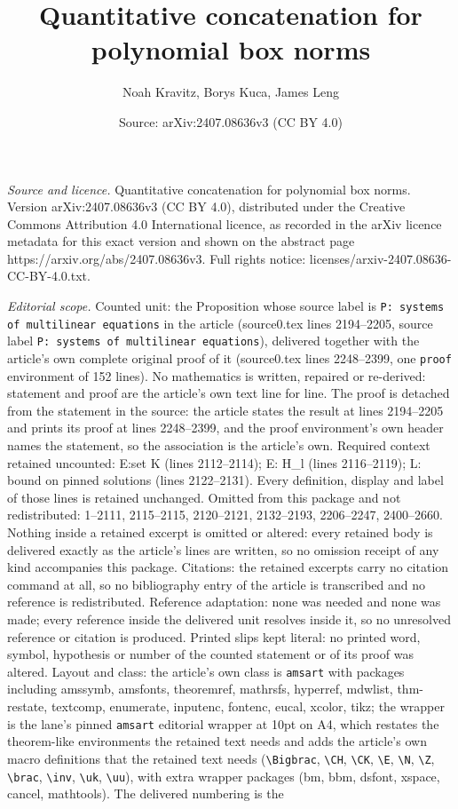 \documentclass[10pt,a4paper]{amsart}
\title[Quantitative concatenation for polynomial box norms]{Quantitative concatenation for polynomial box norms}
\author{Noah Kravitz, Borys Kuca, James Leng}
\date{Source: arXiv:2407.08636v3 (CC BY 4.0)}
\begin{document}
\maketitle

\noindent\emph{Source and licence.} Quantitative concatenation for polynomial box norms. Version arXiv:2407.08636v3 (CC BY 4.0), distributed under the Creative Commons Attribution 4.0 International licence, as recorded in the arXiv licence metadata for this exact version and shown on the abstract page https://arxiv.org/abs/2407.08636v3. Full rights notice: licenses/arxiv-2407.08636-CC-BY-4.0.txt.\par\smallskip

\noindent\textit{Editorial scope.} Counted unit: the Proposition whose source label is \texttt{P: systems of multilinear equations} in the article (source0.tex lines 2194--2205, source label \texttt{P: systems of multilinear equations}), delivered together with the article's own complete original proof of it (source0.tex lines 2248--2399, one \texttt{proof} environment of 152 lines). No mathematics is written, repaired or re-derived: statement and proof are the article's own text line for line. The proof is detached from the statement in the source: the article states the result at lines 2194--2205 and prints its proof at lines 2248--2399, and the proof environment's own header names the statement, so the association is the article's own. Required context retained uncounted: E:set K (lines 2112--2114); E: H\_l (lines 2116--2119); L: bound on pinned solutions (lines 2122--2131). Every definition, display and label of those lines is retained unchanged. Omitted from this package and not redistributed: 1--2111, 2115--2115, 2120--2121, 2132--2193, 2206--2247, 2400--2660. Nothing inside a retained excerpt is omitted or altered: every retained body is delivered exactly as the article's lines are written, so no omission receipt of any kind accompanies this package. Citations: the retained excerpts carry no citation command at all, so no bibliography entry of the article is transcribed and no reference is redistributed. Reference adaptation: none was needed and none was made; every reference inside the delivered unit resolves inside it, so no unresolved reference or citation is produced. Printed slips kept literal: no printed word, symbol, hypothesis or number of the counted statement or of its proof was altered. Layout and class: the article's own class is \texttt{amsart} with packages including amssymb, amsfonts, theoremref, mathrsfs, hyperref, mdwlist, thm-restate, textcomp, enumerate, inputenc, fontenc, eucal, xcolor, tikz; the wrapper is the lane's pinned \texttt{amsart} editorial wrapper at 10pt on A4, which restates the theorem-like environments the retained text needs and adds the article's own macro definitions that the retained text needs (\texttt{\textbackslash Bigbrac}, \texttt{\textbackslash CH}, \texttt{\textbackslash CK}, \texttt{\textbackslash E}, \texttt{\textbackslash N}, \texttt{\textbackslash Z}, \texttt{\textbackslash brac}, \texttt{\textbackslash inv}, \texttt{\textbackslash uk}, \texttt{\textbackslash uu}), with extra wrapper packages (bm, bbm, dsfont, xspace, cancel, mathtools). The delivered numbering is the 
\end{document}
